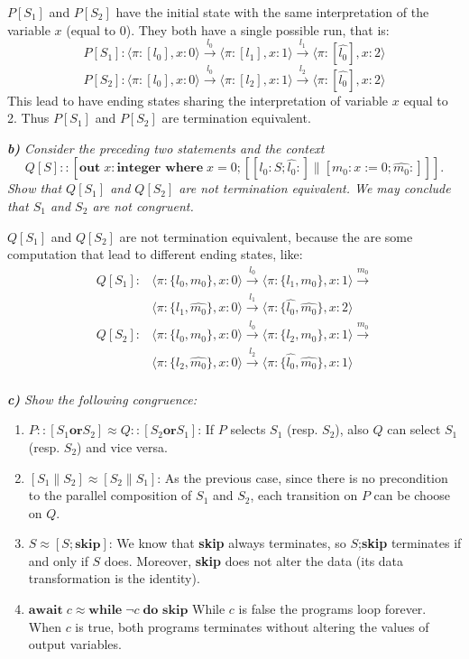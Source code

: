 \documentclass[12pt]{article}
\begin{document}
$P[S_1]$ and $P[S_2]$ have the initial state with the same interpretation of the variable $x$ (equal to 0). They both have a single possible run, that is:
$$ P[S_1]: \langle \pi:[l_0],x:0\rangle \xrightarrow{l_0} \langle \pi:[l_1],x:1\rangle \xrightarrow{l_1} \langle \pi:[\hat{l_0}],x:2\rangle $$
$$ P[S_2]: \langle \pi:[l_0],x:0\rangle \xrightarrow{l_0} \langle \pi:[l_2],x:1\rangle \xrightarrow{l_2} \langle \pi:[\hat{l_0}],x:2\rangle $$
This lead to have ending states sharing the interpretation of variable $x$ equal to 2. Thus $P[S_1]$ and $P[S_2]$ are termination equivalent.

\medskip
\textit{\textbf{b)} Consider the preceding two statements and the context
$$Q[S]:: [\textbf{out}\;x: \textbf{integer where}\;x = 0; [[l_0: S; \hat{l_0}:] \parallel [m_0: x := 0 ; \hat{m_0}:]]].$$
Show that $Q[S_1]$ and $Q[S_2]$ are not termination equivalent. We may conclude that $S_1$ and $S_2$ are not congruent.}

$Q[S_1]$ and $Q[S_2]$ are not termination equivalent, because the are some computation that lead to different ending states, like:
\begin{align*}
Q[S_1]: &	\langle \pi:\{l_0,m_0\},x:0 \rangle \xrightarrow{l_0} 
			\langle \pi:\{l_1,m_0\},x:1 \rangle \xrightarrow{m_0} \\
		&	\langle \pi:\{l_1,\hat{m_0}\},x:0 \rangle \xrightarrow{l_1} 
			\langle \pi:\{\hat{l_0},\hat{m_0}\},x:2\rangle \\
Q[S_2]: &	\langle \pi:\{l_0,m_0\},x:0 \rangle \xrightarrow{l_0} 
			\langle \pi:\{l_2,m_0\},x:1 \rangle \xrightarrow{m_0} \\
		&	\langle \pi:\{l_2,\hat{m_0}\},x:0 \rangle \xrightarrow{l_2} 
			\langle \pi:\{\hat{l_0},\hat{m_0}\},x:1\rangle \\
\end{align*}

\medskip
\textit{\textbf{c)} Show the following congruence:}
\begin{enumerate}
\item $P::[S_1 \textbf{or} S_2] \approx Q::[S_2 \textbf{or} S_1]$: If $P$ selects $S_1$ (resp. $S_2$), also $Q$ can select $S_1$ (resp. $S_2$) and vice versa.
\item $[S_1 \parallel S_2] \approx [S_2 \parallel S_1]$: As the previous case, since there is no precondition to the parallel composition of $S_1$ and $S_2$, each transition on $P$ can be choose on $Q$.
\item $S \approx [S; \textbf{skip}]$: We know that \textbf{skip} always terminates, so $S$;\textbf{skip} terminates if and only if $S$ does. Moreover, \textbf{skip} does not alter the data (its data transformation is the identity).
\item $\textbf{await}\;c \approx \textbf{while}\;\neg c\;\textbf{do skip}$ While $c$ is false the programs loop forever. When $c$ is true, both programs terminates without altering the values of output variables.
\end{enumerate}
\end{document}
